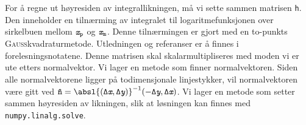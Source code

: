 For å regne ut høyresiden av integrallikningen, må vi sette sammen matrisen \texttt{h}.
Den inneholder en tilnærming av integralet til logaritmefunksjonen over sirkelbuen mellom ${\textit{\texttt{x}}}_{\mathtt{p}}$ og ${\textit{\texttt{x}}}_{\mathtt{m}}$.
Denne tilnærmingen er gjort med en to-punkts \textsc{Gauss}kvadraturmetode.
Utledningen og referanser er å finnes i forelesningsnotatene.
Denne matrisen skal skalarmultipliseres med moden vi er ute etters normalvektor.
Vi lager en metode som finner normalvektoren.
Siden alle normalvektorene ligger på todimensjonale linjestykker, vil normalvektoren være gitt ved $\mathtt{\hat{n}} = \absl{(\mathtt{\Delta} \xtt, \mathtt{\Delta} \ytt)}^{-1}(-\mathtt{\Delta}\textit{\texttt{y}}, \mathtt{\Delta}\xtt)$.
Vi lager en metode som setter sammen høyresiden av likningen, slik at løsningen kan finnes med \texttt{numpy.linalg.solve}.

